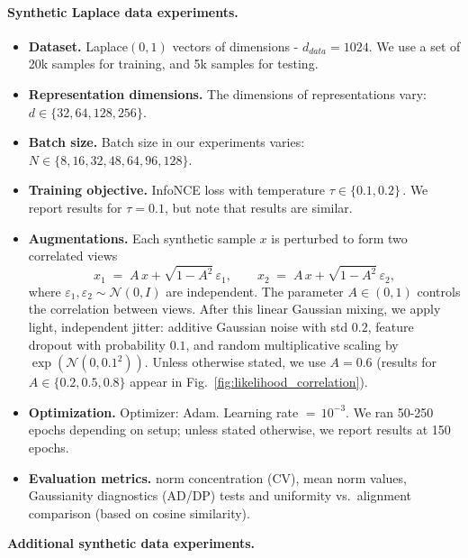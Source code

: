 \documentclass{article}
\begin{document}
\paragraph{Synthetic Laplace data experiments.}
\begin{itemize}
    \item \textbf{Dataset.} Laplace$(0,1)$ vectors of dimensions - $d_{data} = 1024$. We use a set of 20k samples for training, and 5k samples for testing.
    \item \textbf{Representation dimensions.} The dimensions of representations vary: $d \in \{32,64,128,256\}$.
    \item \textbf{Batch size.} Batch size in our experiments varies: $N \in \{8, 16, 32, 48, 64, 96, 128\}$.
    \item \textbf{Training objective.} InfoNCE loss with temperature $\tau \in \{0.1, 0.2\}\,$. We report results for $\tau  = 0.1$, but note that results are similar.
    \item \textbf{Augmentations.}
    Each synthetic sample $x$ is perturbed to form two correlated views
    \begin{equation}
    \label{eq:aug_views}
    x_1 \;=\; A\,x + \sqrt{1-A^2}\,\varepsilon_1,
    \qquad
    x_2 \;=\; A\,x + \sqrt{1-A^2}\,\varepsilon_2,
    \end{equation}
    where $\varepsilon_1,\varepsilon_2 \sim \mathcal N(0,I)$ are independent.
    The parameter $A \in (0,1)$ controls the correlation between views.
    After this linear Gaussian mixing, we apply light, independent jitter:
    additive Gaussian noise with std $0.2$, feature dropout with probability $0.1$, 
    and random multiplicative scaling by $\exp(\mathcal N(0,0.1^2))$.
    Unless otherwise stated, we use $A=0.6$ (results for $A \in \{0.2,0.5,0.8\}$ appear in Fig.~\ref{fig:likelihood_correlation}).
    \item \textbf{Optimization.} Optimizer: Adam. Learning rate $=\, 10^{-3}$. We ran 50-250 epochs depending on setup; unless stated otherwise, we report results at 150 epochs.
    \item \textbf{Evaluation metrics.} 
    norm concentration (CV), mean norm values, Gaussianity diagnostics (AD/DP) tests and uniformity vs.\ alignment comparison (based on cosine similarity).
\end{itemize}

\noindent \textbf{Additional synthetic data experiments.}
\end{document}
